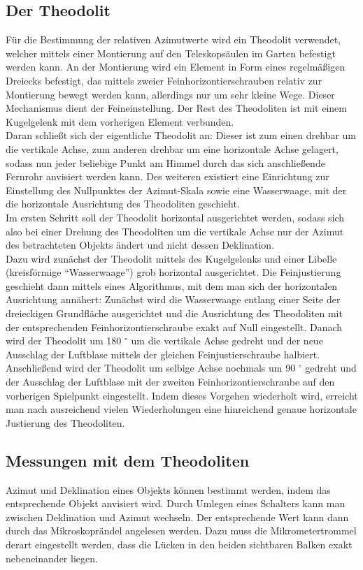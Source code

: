 \subsection{Der Theodolit}
Für die Bestimmung der relativen Azimutwerte wird ein Theodolit verwendet, welcher mittels einer Montierung auf den Teleskopsäulen im Garten befestigt werden kann. An der Montierung wird ein Element in Form eines regelmäßigen Dreiecks befestigt, das mittels zweier Feinhorizontierschrauben relativ zur Montierung bewegt werden kann, allerdings nur um sehr kleine Wege. Dieser Mechanismus dient der Feineinstellung. Der Rest des Theodoliten ist mit einem Kugelgelenk mit dem vorherigen Element verbunden. \\
Daran schließt sich der eigentliche Theodolit an: Dieser ist zum einen drehbar um die vertikale Achse, zum anderen drehbar um eine horizontale Achse gelagert, sodass nun jeder beliebige Punkt am Himmel durch das sich anschließende Fernrohr anvisiert werden kann.  Des weiteren existiert eine Einrichtung zur Einstellung des Nullpunktes der Azimut-Skala sowie eine Wasserwaage, mit der die horizontale Ausrichtung des Theodoliten geschieht. \\
Im ersten Schritt soll der Theodolit horizontal ausgerichtet werden, sodass sich also bei einer Drehung des Theodoliten um die vertikale Achse nur der Azimut des betrachteten Objekts ändert und nicht dessen Deklination.\\
Dazu wird zunächst der Theodolit mittels des Kugelgelenks und einer Libelle (kreisförmige \enquote{Wasserwaage}) grob horizontal ausgerichtet. Die Feinjustierung geschieht dann mittels eines Algorithmus, mit dem man sich der horizontalen Ausrichtung annähert: Zunächst wird die Wasserwaage entlang einer Seite der dreieckigen Grundfläche ausgerichtet und die Ausrichtung des Theodoliten mit der entsprechenden Feinhorizontierschraube exakt auf Null eingestellt. Danach wird der Theodolit um 180 $^\circ$ um die vertikale Achse gedreht und der neue Ausschlag der Luftblase mittels der gleichen Feinjustierschraube halbiert. Anschließend wird der Theodolit um selbige Achse nochmals um 90 $^\circ$ gedreht und der Ausschlag der Luftblase mit der zweiten Feinhorizontierschraube auf den vorherigen Spielpunkt eingestellt. Indem dieses Vorgehen wiederholt wird, erreicht man nach ausreichend vielen Wiederholungen eine hinreichend genaue horizontale Justierung des Theodoliten. \\

\subsection{Messungen mit dem Theodoliten}
Azimut und Deklination eines Objekts können bestimmt werden, indem das entsprechende Objekt anvisiert wird. Durch Umlegen eines Schalters kann man zwischen Deklination und Azimut wechseln. Der entsprechende Wert kann dann durch das Mikroskoprändel angelesen werden. Dazu muss die Mikrometertrommel derart eingestellt werden, dass die Lücken in den beiden sichtbaren Balken exakt nebeneinander liegen. 


